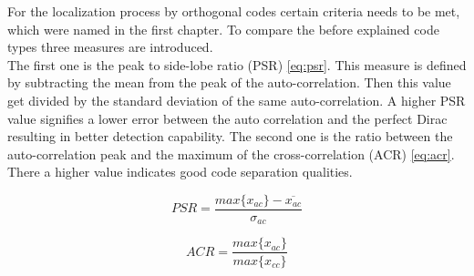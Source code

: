 For the localization process by orthogonal codes certain criteria needs to be met, which were named in the first chapter. To compare the before explained code types three measures are introduced. \\ 
The first one is the peak to side-lobe ratio (PSR) \ref{eq:psr}. This measure is defined by subtracting the mean from the peak of the auto-correlation. Then this value get divided by the standard deviation of the same auto-correlation. A higher PSR value signifies a lower error between the auto correlation and the perfect Dirac resulting in better detection capability. The second one is the ratio between the auto-correlation peak and the maximum of the cross-correlation (ACR) \ref{eq:acr}. There a higher value indicates good code separation qualities. 

\begin{equation}
PSR=\dfrac{max\{x_{ac}\}-\overline{x_{ac}}}{\sigma_{ac}}
\label{eq:psr}
\end{equation}

\begin{equation}
ACR=\dfrac{max\{x_{ac}\}}{max\{{x_{cc}\}}}
\label{eq:acr}
\end{equation}

%
%
%
%
%

